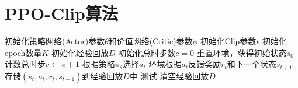 \documentclass[11pt]{ctexart}
\begin{document}
\section{PPO-Clip算法}
\begin{algorithm}[H] %
	\renewcommand{\thealgorithm}{} %
	\caption{} 
	\begin{algorithmic}[1] %
		\STATE 初始化策略网络(Actor)参数$\theta$和价值网络(Critic)参数$\phi$
		\STATE 初始化Clip参数$\epsilon$
		\STATE 初始化epoch数量$K$
		\STATE 初始化经验回放$D$
		\STATE 初始化总时步数$c=0$
			\STATE 重置环境，获得初始状态$s_0$
				\STATE 计数总时步$c \leftarrow c+1$
				\STATE 根据策略$\pi_{\theta}$选择$a_t$
				\STATE 环境根据$a_t$反馈奖励$r_t$和下一个状态$s_{t+1}$
				\STATE 存储$(s_t,a_t,r_t,s_{t+1})$到经验回放$D$中
						\STATE 测试
					\ENDFOR
					\STATE 清空经验回放$D$
				\ENDIF
			\ENDFOR
		\ENDFOR
	\end{algorithmic}
\end{algorithm}
\clearpage
\end{document}
